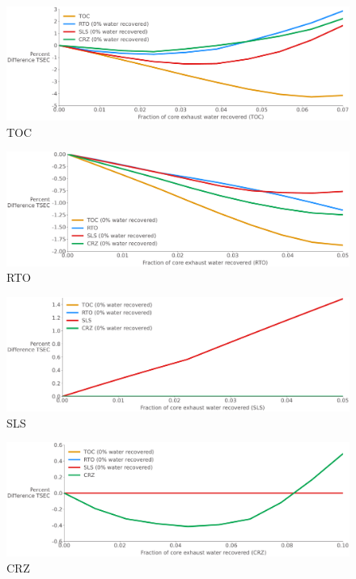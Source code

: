 \documentclass[12pt]{new-aiaa}
\begin{document}
\begin{figure}[!hbt]
    \centering
    \begin{minipage}{0.48\textwidth}
        \centering
        \includegraphics[width=1.0\textwidth]{TSEC_N3-CLVR-H2-0-7-TOC.pdf}
        {TOC}
    \end{minipage}
    \begin{minipage}{0.48\textwidth}
        \centering
        \includegraphics[width=1.0\textwidth]{TSEC_N3-CLVR-H2-0-5-RTO.pdf}
        {RTO}
    \end{minipage}
    \begin{minipage}{0.48\textwidth}
        \centering
        \includegraphics[width=1.0\textwidth]{TSEC_N3-CLVR-H2-0-5-SLS.pdf}
        {SLS}
    \end{minipage}
    \begin{minipage}{0.48\textwidth}
        \centering
        \includegraphics[width=1.0\textwidth]{TSEC_N3-CLVR-H2-0-10-CRZ.pdf}
        {CRZ}
    \end{minipage}
    \caption{}
    \label{fig:para_study}
\end{figure}
\end{document}
